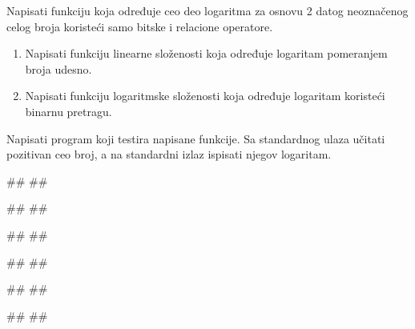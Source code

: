 \begin{Answer}[ref=3_09]
\end{Answer}
\begin{Exercise}[label=3_10]
  Napisati funkciju koja određuje ceo deo logaritma za osnovu 2 datog
  neoznačenog celog broja koristeći samo bitske i relacione
  operatore.
  \begin{enumerate}
  \item Napisati funkciju linearne složenosti koja određuje
    logaritam pomeranjem broja udesno.
  \item Napisati funkciju logaritmske složenosti koja određuje
    logaritam koristeći binarnu pretragu.
  \end{enumerate}  
  Napisati program koji testira napisane funkcije. Sa standardnog ulaza učitati 
  pozitivan ceo broj, a na standardni izlaz ispisati njegov logaritam.

\begin{minitest}
\begin{test}{1}
#\naslovUlaz#
##
  
#\naslovIzlaz#
##
\end{test}
\end{minitest}
\begin{minitest}
\begin{test}{2}
#\naslovUlaz#
##
  
#\naslovIzlaz#
##
\end{test}
\end{minitest}
\begin{minitest}
\begin{test}{3}
#\naslovUlaz#
##
  
#\naslovIzlaz#
##
\end{test}
\end{minitest}


\end{Exercise}

